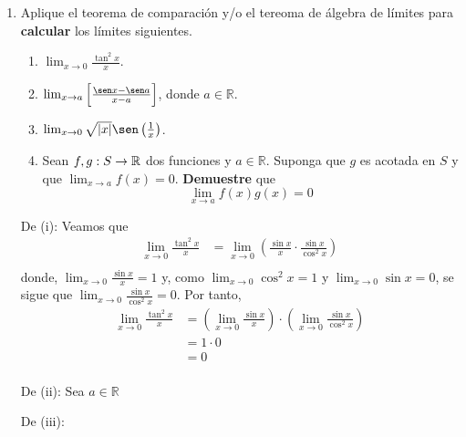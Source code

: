 \documentclass[12pt]{article}
\begin{document}
\begin{enumerate}
    \item Aplique el teorema de comparación y/o el tereoma de álgebra de límites para \textbf{calcular} los límites siguientes.
    \begin{enumerate}
        \item $\lim_{x\rightarrow0}\frac{\tan^2x}{x}$.
        \item $\lim_{x\rightarrow a}\left[\frac{\sen x-\sen a}{x-a} \right]$, donde $a\in\mathbb{R}$.
        \item $\lim_{x\rightarrow0}\sqrt{\abs{x}}\sen\left(\frac{1}{x}\right)$.
        \item Sean $f,g:S\rightarrow\mathbb{R}$ dos funciones y $a\in\mathbb{R}$. Suponga que $g$ es acotada en $S$ y que $\lim_{x\rightarrow a}f(x)=0$. \textbf{Demuestre} que
        \begin{equation*}
            \lim_{x\rightarrow a}f(x)g(x)=0
        \end{equation*}
    \end{enumerate}

    \begin{sol}
        De (i): Veamos que
        \begin{equation*}
            \begin{split}
                \lim_{x\rightarrow0}\frac{\tan^2x}{x}&=\lim_{x\rightarrow0}\left(\frac{\sin x}{x}\cdot\frac{\sin x}{\cos^2 x}\right) \\
            \end{split}
        \end{equation*}
        donde, $\lim_{x\rightarrow0}\frac{\sin x}{x}=1$ y, como $\lim_{x\rightarrow0}\cos^2 x=1$ y $\lim_{x\rightarrow0}\sin x=0$, se sigue que $\lim_{x\rightarrow0}\frac{\sin x}{\cos^2 x}=0$. Por tanto,
        \begin{equation*}
            \begin{split}
                \lim_{x\rightarrow0}\frac{\tan^2x}{x}&=\left(\lim_{x\rightarrow0}\frac{\sin x}{x}\right)\cdot\left(\lim_{x\rightarrow0}\frac{\sin x}{\cos^2 x}\right)\\
                &=1\cdot 0\\
                &=0\\
            \end{split}
        \end{equation*}

        De (ii): Sea $a\in\mathbb{R}$

        De (iii):


\end{sol}
\end{enumerate}
\end{document}
